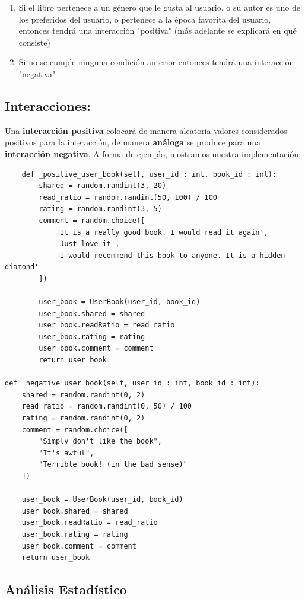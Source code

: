 \documentclass[14pt]{extarticle}
\begin{document}
\begin{enumerate}
    \item Si el libro pertenece a un género que le gusta al usuario, o su autor es uno de los preferidos del usuario, o pertenece a la época favorita del usuario, entonces tendrá una interacción "positiva" (más adelante se explicará en qué consiste)
    \item Si no se cumple ninguna condición anterior entonces tendrá una interacción "negativa"
\end{enumerate}

\subsection{Interacciones:}

Una \textbf{interacción positiva} colocará de manera aleatoria valores considerados positivos para la interacción, de manera \textbf{análoga} se produce para una \textbf{interacción negativa}. A forma de ejemplo, mostramos nuestra implementación:

\begin{verbatim}
    def _positive_user_book(self, user_id : int, book_id : int):
        shared = random.randint(3, 20)
        read_ratio = random.randint(50, 100) / 100
        rating = random.randint(3, 5)
        comment = random.choice([
            'It is a really good book. I would read it again',
            'Just love it',
            'I would recommend this book to anyone. It is a hidden diamond'
        ])

        user_book = UserBook(user_id, book_id)
        user_book.shared = shared
        user_book.readRatio = read_ratio
        user_book.rating = rating
        user_book.comment = comment
        return user_book

def _negative_user_book(self, user_id : int, book_id : int):
    shared = random.randint(0, 2)
    read_ratio = random.randint(0, 50) / 100
    rating = random.randint(0, 2)
    comment = random.choice([
        "Simply don't like the book",
        "It's awful",
        "Terrible book! (in the bad sense)"
    ])

    user_book = UserBook(user_id, book_id)
    user_book.shared = shared
    user_book.readRatio = read_ratio
    user_book.rating = rating
    user_book.comment = comment
    return user_book    
\end{verbatim}

\subsection{Análisis Estadístico }
\end{document}
